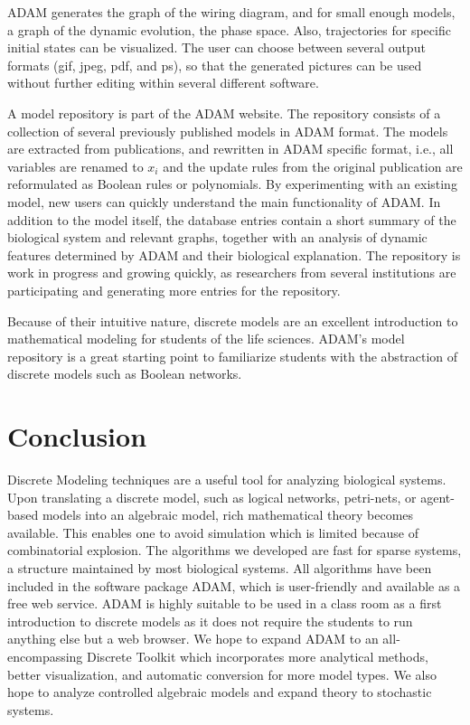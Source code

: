 \documentclass[11pt]{amsart}
\begin{document}
ADAM generates the graph of the wiring diagram, and for small enough models, a graph of the dynamic evolution, the phase space. Also, trajectories for specific initial states can be visualized. The user can choose between several output formats (gif, jpeg, pdf, and ps), so that the generated pictures can be used without further editing within several different software.
 
A model repository is part of the ADAM website. The repository consists of a collection of several previously published models in ADAM format. The models are extracted from publications, and rewritten in ADAM specific format, i.e., all variables are renamed to $x_i$ and the update rules from the original publication are reformulated as Boolean rules or polynomials. By experimenting with an existing model, new users can quickly understand the main functionality of ADAM. In addition to the model itself, the database entries contain a short summary of the biological system and relevant graphs, together with an analysis of dynamic features determined by ADAM and their biological explanation. The repository is work in progress and growing quickly, as researchers from several institutions are participating and  generating more entries for the repository.
 
Because of their intuitive nature, discrete models are an excellent introduction to mathematical modeling for students of the life sciences. ADAM's model repository is a great starting point to familiarize students with the abstraction of discrete models such as Boolean networks.
 
\section{Conclusion}
 
Discrete Modeling techniques are a useful tool for analyzing biological
systems. Upon translating a discrete model, such as logical networks,
petri-nets, or agent-based models into an algebraic model, rich mathematical
theory becomes available. This enables one to
avoid simulation which is limited because of combinatorial explosion. The algorithms
we developed are fast for sparse systems, a structure maintained by most biological
systems. All algorithms have been included in the software package ADAM\cite{ADAM},
which is user-friendly and available as a free web service.
ADAM is highly suitable to be used in a class room as a first
introduction to discrete models as it does not require the students to run
anything else but a web browser.
We hope to expand ADAM to an all-encompassing Discrete Toolkit which incorporates more
analytical methods, better visualization, and automatic conversion for more model types.
We also hope to analyze controlled algebraic models and expand theory to stochastic systems.
 
\end{document}
